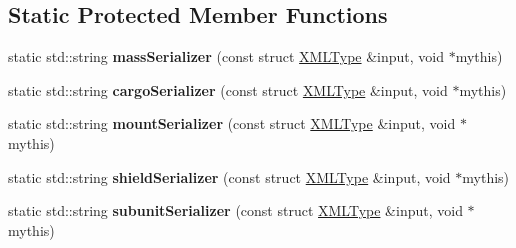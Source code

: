 \subsection*{Static Protected Member Functions}
\begin{DoxyCompactItemize}
\item 
static std\+::string {\bfseries mass\+Serializer} (const struct \hyperlink{structXMLType}{X\+M\+L\+Type} \&input, void $\ast$mythis)\hypertarget{classUnit_a31a729638e1c962161c5339362b531c2}{}\label{classUnit_a31a729638e1c962161c5339362b531c2}

\item 
static std\+::string {\bfseries cargo\+Serializer} (const struct \hyperlink{structXMLType}{X\+M\+L\+Type} \&input, void $\ast$mythis)\hypertarget{classUnit_ad1cee624f53490b9f1e4922823030b29}{}\label{classUnit_ad1cee624f53490b9f1e4922823030b29}

\item 
static std\+::string {\bfseries mount\+Serializer} (const struct \hyperlink{structXMLType}{X\+M\+L\+Type} \&input, void $\ast$mythis)\hypertarget{classUnit_a548a4afb74c9928ac7054839ee3312d7}{}\label{classUnit_a548a4afb74c9928ac7054839ee3312d7}

\item 
static std\+::string {\bfseries shield\+Serializer} (const struct \hyperlink{structXMLType}{X\+M\+L\+Type} \&input, void $\ast$mythis)\hypertarget{classUnit_a56ff0deb7d50cb97e5fd87443ee6f624}{}\label{classUnit_a56ff0deb7d50cb97e5fd87443ee6f624}

\item 
static std\+::string {\bfseries subunit\+Serializer} (const struct \hyperlink{structXMLType}{X\+M\+L\+Type} \&input, void $\ast$mythis)\hypertarget{classUnit_aa14672d021391e790108a3e3990d358f}{}\label{classUnit_aa14672d021391e790108a3e3990d358f}

\end{DoxyCompactItemize}
